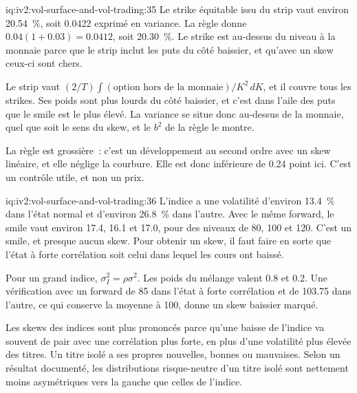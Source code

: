 \begin{solution}{iq:iv2:vol-surface-and-vol-trading:35}
Le strike équitable issu du strip vaut environ 20.54~\%, soit 0.0422 exprimé en variance. La règle donne $0.04(1 + 0.03) = 0.0412$, soit 20.30~\%. Le strike est au-dessus du niveau à la monnaie parce que le strip inclut les puts du côté baissier, et qu'avec un skew ceux-ci sont chers.

Le strip vaut $(2/T)\int(\text{option hors de la monnaie})/K^2\,dK$, et il couvre tous les strikes. Ses poids sont plus lourds du côté baissier, et c'est dans l'aile des puts que le smile est le plus élevé. La variance se situe donc au-dessus de la monnaie, quel que soit le sens du skew, et le $b^2$ de la règle le montre.

La règle est grossière~: c'est un développement au second ordre avec un skew linéaire, et elle néglige la courbure. Elle est donc inférieure de 0.24 point ici. C'est un contrôle utile, et non un prix.

\end{solution}

\begin{solution}{iq:iv2:vol-surface-and-vol-trading:36}
L'indice a une volatilité d'environ 13.4~\% dans l'état normal et d'environ 26.8~\% dans l'autre. Avec le même forward, le smile vaut environ 17.4, 16.1 et 17.0, pour des niveaux de 80, 100 et 120. C'est un smile, et presque aucun skew. Pour obtenir un skew, il faut faire en sorte que l'état à forte corrélation soit celui dans lequel les cours ont baissé.

Pour un grand indice, $\sigma_I^2 = \rho\sigma^2$. Les poids du mélange valent 0.8 et 0.2. Une vérification avec un forward de 85 dans l'état à forte corrélation et de 103.75 dans l'autre, ce qui conserve la moyenne à 100, donne un skew baissier marqué.

Les skews des indices sont plus prononcés parce qu'une baisse de l'indice va souvent de pair avec une corrélation plus forte, en plus d'une volatilité plus élevée des titres. Un titre isolé a ses propres nouvelles, bonnes ou mauvaises. Selon un résultat documenté, les distributions risque-neutre d'un titre isolé sont nettement moins asymétriques vers la gauche que celles de l'indice.

\end{solution}

